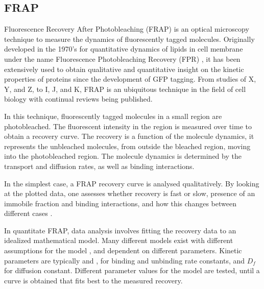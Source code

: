   \subsection{FRAP}

    Fluorescence Recovery After Photobleaching (FRAP) is an optical
    microscopy technique to measure the dynamics of fluorescently
    tagged molecules.
    Originally developed in the 1970's for quantitative dynamics of lipids
    in cell membrane under the name Fluorescence Photobleaching
    Recovery (FPR) \citep{axelrod1976mobility}, it has
    been extensively used to obtain qualitative and quantitative
    insight on the kinetic properties of proteins since the development
    of GFP tagging.
    From studies of X, Y, and Z, to I, J, and K, FRAP is an ubiquitous
    technique in the field of cell biology with continual reviews being
    published.

    In this technique, fluorescently tagged molecules in a small region
    are photobleached.  The fluorescent intensity in the region is
    measured over time to obtain a recovery curve.  The recovery is a
    function of the molecule dynamics, it represents the unbleached
    molecules, from outside the bleached region, moving into the
    photobleached region.  The molecule dynamics is determined by the
    transport and diffusion rates, as well as binding interactions.

    In the simplest case, a FRAP recovery curve is analysed
    qualitatively.  By looking at the plotted data, one assesses
    whether recovery is fast or slow, presence of an immobile
    fraction and binding interactions, and how this changes
    between different cases .

    \begin{figure}
      \centering
      \caption{}
      \label{fig:intro:frap-curve-example}
    \end{figure}

    In quantitate FRAP, data analysis involves fitting the recovery
    data to an idealized mathematical model.
    Many different models exist with different assumptions for the model
    , and dependent on different
    parameters.
    Kinetic parameters are typically \Kon{} and \Koff{}, for
    binding and unbinding rate constants, and $D_{f}$ for diffusion constant.
    Different parameter values for the model are tested, until a curve is
    obtained that fits best to the measured recovery.

